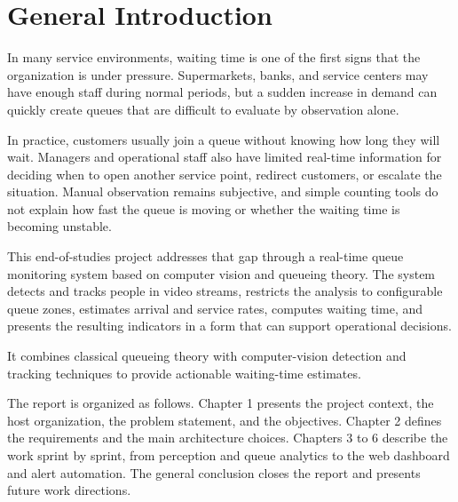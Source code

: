 \chapter*{General Introduction}

In many service environments, waiting time is one of the first signs that the organization is under pressure. Supermarkets, banks, and service centers may have enough staff during normal periods, but a sudden increase in demand can quickly create queues that are difficult to evaluate by observation alone.

In practice, customers usually join a queue without knowing how long they will wait. Managers and operational staff also have limited real-time information for deciding when to open another service point, redirect customers, or escalate the situation. Manual observation remains subjective, and simple counting tools do not explain how fast the queue is moving or whether the waiting time is becoming unstable.

This end-of-studies project addresses that gap through a real-time queue monitoring system based on computer vision and queueing theory. The system detects and tracks people in video streams, restricts the analysis to configurable queue zones, estimates arrival and service rates, computes waiting time, and presents the resulting indicators in a form that can support operational decisions.

It combines classical queueing theory with computer-vision detection and tracking techniques 
\cite{gross_queueing,ultralytics_docs} to provide actionable waiting-time estimates.

The report is organized as follows. Chapter 1 presents the project context, the host organization, the problem statement, and the objectives. Chapter 2 defines the requirements and the main architecture choices. Chapters 3 to 6 describe the work sprint by sprint, from perception and queue analytics to the web dashboard and alert automation. The general conclusion closes the report and presents future work directions.

